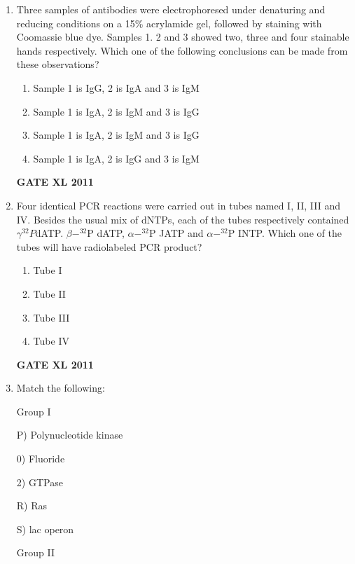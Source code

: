 \documentclass[journal,12pt,onecolumn]{IEEEtran}
\begin{document}
\begin{enumerate}
\item {Three samples of antibodies were electrophoresed under denaturing and reducing conditions on a 15\% acrylamide gel, followed by staining with Coomassie blue dye. Samples 1. 2 and 3 showed two, three and four stainable hands respectively. Which one of the following conclusions can be made from these observations?}
		\begin{enumerate}
			\item Sample 1 is IgG, 2 is IgA and 3 is IgM
			\item Sample 1 is IgA, 2 is IgM and 3 is IgG
			\item Sample 1 is IgA, 2 is IgM and 3 is IgG
			\item Sample 1 is IgA, 2 is IgG and 3 is IgM
		\end{enumerate}
		\hfill{\textbf{GATE XL 2011}}

\item {Four identical PCR reactions were carried out in tubes named I, II, III and IV. Besides the usual mix of dNTPs, each of the tubes respectively contained $\gamma^{32}P$dATP. $\beta-^{32}$P dATP, $\alpha-^{32}$P JATP and $\alpha - ^{32}$P INTP. Which one of the tubes will have radiolabeled PCR product?}


		\begin{enumerate}
			\item Tube I
			\item Tube II
			\item Tube III
			\item Tube IV
		\end{enumerate}
		\hfill{\textbf{GATE XL 2011}}

\item {Match the following:}


\begin{minipage}{0.5\textwidth}
\begin{flushleft}

Group I

P) Polynucleotide kinase

0) Fluoride

2) GTPase

R) Ras

S) lac operon

		\end{flushleft}
		\end{minipage}
	\begin{minipage}{0.5\textwidth}
		\begin{flushleft}
Group II


\end{flushleft}
\end{minipage}
\end{enumerate}
\end{document}
